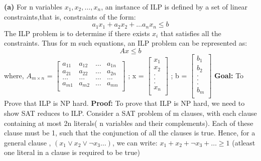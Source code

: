 \documentclass{article}
\renewcommand\part[1]{\vspace{.10in}\textbf{(#1)}}
\begin{document}
\part{a} For n variables $x_{1}, x_{2}, \dots , x_{n}$, an instance of ILP is defined by a set of linear constraints,that is, constraints of the form: \newline
\[ a_{1}x_{1} + a_{2}x_{2} + \dots a_{n}x_{n} \leq b\]
The ILP problem is to determine if there exists $x_{i}$ that satisfies all the constraints.
Thus for m such equations, an ILP problem can be represented as: \newline
\[Ax \leq b\]
where, \newline
$A_{m \times n}$ = $\begin{bmatrix}
a_{11} & a_{12} & \dots & a_{1n} \\
a_{21} & a_{22} & \dots & a_{2n} \\
\dots & \dots & \dots & \dots \\
a_{m1} & a_{m2} & \dots & a_{mn} \\ 
\end{bmatrix}$
;  x = $\begin{bmatrix}
x_{1} \\ x_{2} \\ . \\ . \\ . \\ x_{n} \\
\end{bmatrix}$
; b = $\begin{bmatrix}
b_{1} \\ b_{2} \\ . \\ . \\ . \\ b_{m} \\
\end{bmatrix}$ \newline
\textbf {Goal:} To Prove that ILP is NP hard. \newline
\textbf{Proof:} To prove that ILP is NP hard, we need to show SAT reduces to ILP. \newline
Consider a SAT problem of m clauses, with each clause containing at most 2n literals( n variables and their complements). Each of these clause must be 1, such that the conjunction of all the clauses is true. Hence, for a general clause , $(x_{1} \vee x_{2} \vee \neg x_{3} \dots )$, we can write:\newline
\hspace*{1cm} $x_{1} + x_{2} + \neg x_{3} + \dots \geq 1$ (atleast one literal in a clause is required to be true) \newline
\end{document}
